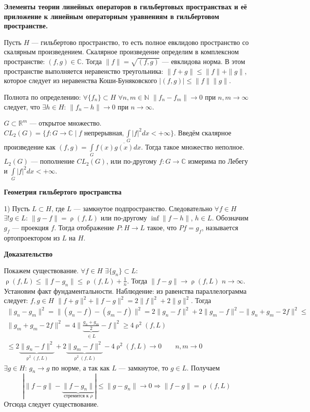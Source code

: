 \documentclass[12pt]{article}
\DeclareMathOperator{\rh}{\rho}
\begin{document}
\begin{center}
\textbf{Элементы теории линейных операторов в гильбертовых пространствах и её приложение к линейным операторным уравнениям в гильбертовом пространстве.}
\end{center}

Пусть $H$ --- гильбертово пространство, то есть полное евклидово пространство со скалярным произведением.
Скалярное произведение определим в комплексном пространстве: $(f,g)\in \mathbb C$.
Тогда $\|f\|=\sqrt{(f,g)}$ --- евклидова норма.
В этом пространстве выполняется неравенство треугольника: $\|f + g\| \le \|f\| + \|g\|$, которое следует из неравенства Коши-Буняковского $|(f,g)| \le \|f\|\|g\|$.

Полнота по определению: $\forall \{f_n\} \subset H$ $\forall n,m \in \mathbb N$ $\|f_n - f_m\| \to 0$ при $n,m \to \infty$ следует,
что $\exists h \in H$: $\|f_n - h\| \to 0$
при $n \to \infty$.

$G \subset \mathbb R^m$ --- открытое множество.
$CL_2(G) = \{f\colon G \to \mathbb C \mid f\text{ непрерывная}, \int\limits_G |f|^2 dx < +\infty\}$.
Введём скалярное произведение как $(f, g)=\int\limits_G f(x) \overline{g(x)} dx$. Тогда такое множество неполное.
$L_2(G)$ --- пополнение $CL_2(G)$, или по-другому $f:G\to\mathbb C$ измерима по Лебегу и $\int\limits_G |f|^2 dx < +\infty$.
\begin{center}
\textbf{Геометрия гильбертого пространства}
\end{center}

1) Пусть $L \subset H$, где $L$ --- замкнутое подпространство.
Следовательно $\forall f \in H$ $\exists! g\in L$: $\|g - f\|=\rh(f,L)$ или по-другому $\inf\|f - h\|$, $h\in L$.
Обозначим $g_f$ --- проекция $f$.
Тогда отображение $P:H \to L$ такое, что $Pf = g_f$, называется ортопроектором из $L$ на $H$.

\textbf{Доказательство}

Покажем существование.
$\forall f \in H$ $\exists \{g_n\} \subset L$: $\rh(f, L) \le \|f-g_n\| \le \rh(f,L) + \frac{1}{n}$.
Тогда $\|f - g\| \to \rh(f,L)$ $n \to \infty$.
Установим факт фундаментальности.
Наблюдение: из равенства параллелограмма следует: $f, g\in H$ $\|f + g\|^2 + \|f - g\|^2 = 2\|f\|^2 + 2\|g\|^2$.
Тогда
\begin{gather*}
\|g_n - g_m\|^2 = \|(g_n - f) - (g_m - f)\|^2 = 2\|g_n - f\|^2 + 2\|g_m - f\|^2 - \|g_n + g_m - 2f\|^2 \boxed{\le}\\
\|g_m+g_m-2f\|^2 = 4\|\underbrace{\frac{g_n + g_m}{2}}_{\in L} - f\|^2 \ge 4\rh^2(f, L)\\
\boxed{\le} 2\underbrace{\|g_n - f\|^2}_{\rh^2(f, L)} + 2\underbrace{\|g_m - f\|^2}_{\rh^2(f,L)} - 4\rh^2(f,L) \to 0 \qquad n,m \to 0
\end{gather*}
$\exists g \in H$: $g_n \to g$ по норме, а так как $L$ --- замкнутое, то $g \in L$.
Получаем 
$$
|\|f - g\| - \underbrace{\|f - g_n\|}_{\text{стремится к }\rho}| \le \|g - g_n\| \to 0 \Rightarrow \|f-g\| = \rh(f,L)
$$
Отсюда следует существование.
\end{document}
